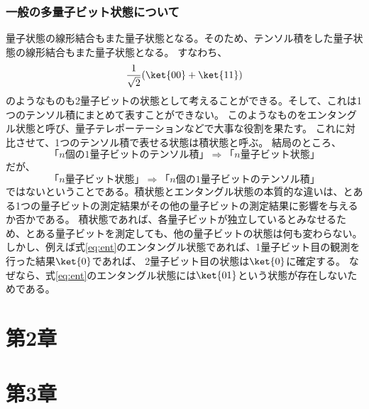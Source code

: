 \documentclass[a4paper,11pt,uplatex]{jsarticle}%
\begin{document}
\subsubsection*{一般の多量子ビット状態について}
量子状態の線形結合もまた量子状態となる。そのため、テンソル積をした量子状態の線形結合もまた量子状態となる。
すなわち、
\begin{equation}
  \frac{1}{\sqrt{2}}(\ket{00}+\ket{11})
  \label{eq:ent}
\end{equation}
のようなものも2量子ビットの状態として考えることができる。そして、これは1つのテンソル積にまとめて表すことができない。
このようなものをエンタングル状態と呼び、量子テレポーテーションなどで大事な役割を果たす。
これに対比させて、1つのテンソル積で表せる状態は積状態と呼ぶ。
結局のところ、
\begin{equation}
  \text{「$n$個の1量子ビットのテンソル積」}\Rightarrow \text{「$n$量子ビット状態」}
\end{equation}
だが、
\begin{equation}
  \text{「$n$量子ビット状態」} \Rightarrow \text{「$n$個の1量子ビットのテンソル積」}
\end{equation}
ではないということである。積状態とエンタングル状態の本質的な違いは、とある1つの量子ビットの測定結果がその他の量子ビットの測定結果に影響を与えるか否かである。
積状態であれば、各量子ビットが独立しているとみなせるため、とある量子ビットを測定しても、他の量子ビットの状態は何も変わらない。
しかし、例えば式\eqref{eq:ent}のエンタングル状態であれば、1量子ビット目の観測を行った結果$\ket{0}$であれば、
2量子ビット目の状態は$\ket{0}$に確定する。
なぜなら、式\eqref{eq:ent}のエンタングル状態には$\ket{01}$という状態が存在しないためである。


\section{第2章}

\section{第3章}
\end{document}
